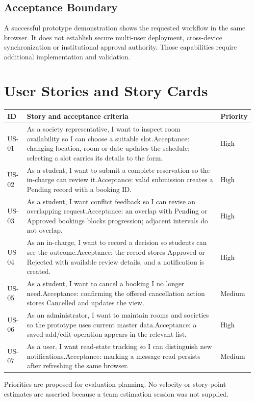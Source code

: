 \documentclass[11pt,a4paper]{report}
\begin{document}
\subsection{Acceptance Boundary}
A successful prototype demonstration shows the requested workflow in the same browser. It does not establish secure multi-user deployment, cross-device synchronization or institutional approval authority. Those capabilities require additional implementation and validation.
\clearpage
\section{User Stories and Story Cards}
\begin{tabularx}{\textwidth}{@{}p{13mm}Yp{21mm}@{}}\toprule ID & Story and acceptance criteria & Priority\\\midrule
US-01 & As a society representative, I want to inspect room availability so I can choose a suitable slot.\newline Acceptance: changing location, room or date updates the schedule; selecting a slot carries its details to the form. & High\\
US-02 & As a student, I want to submit a complete reservation so the in-charge can review it.\newline Acceptance: valid submission creates a Pending record with a booking ID. & High\\
US-03 & As a student, I want conflict feedback so I can revise an overlapping request.\newline Acceptance: an overlap with Pending or Approved bookings blocks progression; adjacent intervals do not overlap. & High\\
US-04 & As an in-charge, I want to record a decision so students can see the outcome.\newline Acceptance: the record stores Approved or Rejected with available review details, and a notification is created. & High\\
US-05 & As a student, I want to cancel a booking I no longer need.\newline Acceptance: confirming the offered cancellation action stores Cancelled and updates the view. & Medium\\
US-06 & As an administrator, I want to maintain rooms and societies so the prototype uses current master data.\newline Acceptance: a saved add/edit operation appears in the relevant list. & High\\
US-07 & As a user, I want read-state tracking so I can distinguish new notifications.\newline Acceptance: marking a message read persists after refreshing the same browser. & Medium\\\bottomrule\end{tabularx}
Priorities are proposed for evaluation planning. No velocity or story-point estimates are asserted because a team estimation session was not supplied.
\end{document}
